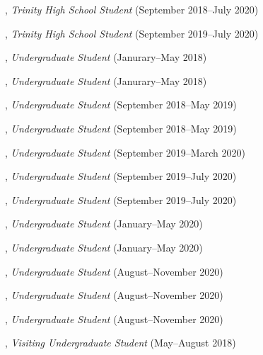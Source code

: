 \documentclass[10pt]{article}
\newenvironment{myindentpar}[1]%
{\begin{list}{}%
         {\setlength{\leftmargin}{#1}}%
         \item[]%
}
{\end{list}}
\newcounter{list}
\begin{document}
\begin{myindentpar}{0.75cm}
	
\hspace{-0.75cm}{\bf Eric Zhang}, \textit{Trinity High School Student} (September 2018--July 2020)

\hspace{-0.75cm}{\bf Michael Florin}, \textit{Trinity High School Student} (September 2019--July 2020)

\hspace{-0.75cm}{\bf Matthew Malir}, \textit{Undergraduate Student} (Janurary--May 2018)
	
\hspace{-0.75cm}{\bf Sebastian Miner}, \textit{Undergraduate Student} (Janurary--May 2018)

\hspace{-0.75cm}{\bf Matthew Schoenbauer}, \textit{Undergraduate Student} (September 2018--May 2019)
	
\hspace{-0.75cm}{\bf Tina Wu}, \textit{Undergraduate Student} (September 2018--May 2019)

\hspace{-0.75cm}{\bf Chan Hee Song}, \textit{Undergraduate Student} (September 2019--March 2020)

\hspace{-0.75cm}{\bf Xiangyu Dong}, \textit{Undergraduate Student} (September 2019--July 2020)

\hspace{-0.75cm}{\bf Tianze Zheng}, \textit{Undergraduate Student} (September 2019--July 2020)

\hspace{-0.75cm}{\bf Alvin Alaphat}, \textit{Undergraduate Student} (January--May 2020)

\hspace{-0.75cm}{\bf Luke Marushack}, \textit{Undergraduate Student} (January--May 2020)

\hspace{-0.75cm}{\bf Joseph Kuebler}, \textit{Undergraduate Student} (August--November 2020)

\hspace{-0.75cm}{\bf Facundo Munoz}, \textit{Undergraduate Student} (August--November 2020)

\hspace{-0.75cm}{\bf Fangcong Yin}, \textit{Undergraduate Student} (August--November 2020)

\hspace{-0.75cm}{\bf Wenhao Yu}, \textit{Visiting Undergraduate Student} (May--August 2018)


\end{myindentpar}
\end{document}
